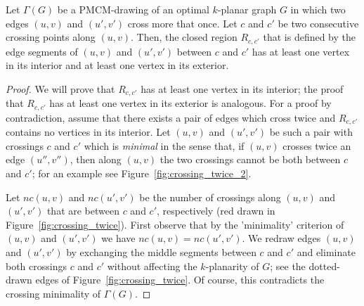 \begin{lemma}
Let $\Gamma(G)$ be a PMCM-drawing of an optimal $k$-planar graph $G$ in which two edges $(u,v)$ and $(u',v')$ cross more that once. Let $c$ and $c'$ be two consecutive crossing points along $(u,v)$. Then, the closed region $R_{c,c'}$ that is defined by the edge segments of $(u,v)$ and $(u',v')$ between $c$ and $c'$ has at least one vertex in its interior and at least one vertex in its exterior.
\label{lem:crossing_twice}
\end{lemma}
\begin{proof}
We will prove that $R_{c,c'}$ has at least one vertex in its interior; the proof that $R_{c,c'}$ has at least one vertex in its exterior is analogous. For a proof by contradiction, assume that there exists a pair of edges which cross twice and $R_{c,c'}$ contains no vertices in its interior. Let $(u,v)$ and $(u',v')$ be such a pair with crossings $c$ and $c'$ which is \emph{minimal} in the sense that, if $(u,v)$ crosses twice an edge  $(u'',v'')$, then along $(u,v)$ the two crossings cannot be both between $c$ and $c'$; for an example see Figure~\ref{fig:crossing_twice_2}.

Let $nc(u,v)$ and $nc(u',v')$ be the number of crossings along $(u,v)$ and $(u',v')$ that are between $c$ and $c'$, respectively (red drawn in Figure~\ref{fig:crossing_twice}). First observe that by the 'minimality' criterion of $(u,v)$ and $(u',v')$ we have $nc(u,v) = nc(u',v')$. We redraw edges $(u,v)$ and $(u',v')$ by exchanging the middle segments between $c$ and $c'$ and eliminate both crossings $c$ and $c'$ without affecting the $k$-planarity of $G$; see the dotted-drawn edges of Figure~\ref{fig:crossing_twice}. Of course, this contradicts the crossing minimality of $\Gamma(G)$.
\end{proof}
 
